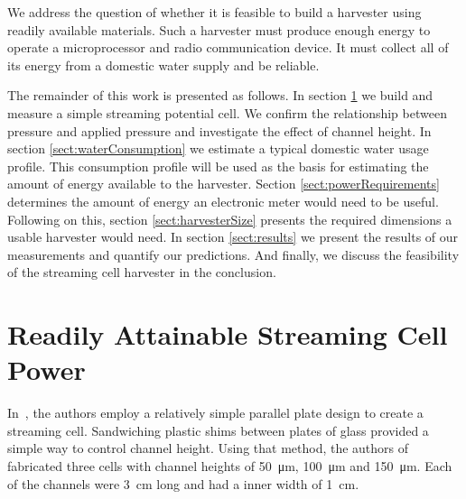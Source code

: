 \documentclass[10pt,final,journal]{IEEEtran}
\begin{document}
    We address the question of whether it is feasible to build a harvester using readily available materials.
    Such a harvester must produce enough energy to operate a microprocessor and radio communication device.
    It must collect all of its energy from a domestic water supply and be reliable.

    The remainder of this work is presented as follows.
    In section \ref{sect:streamingCell} we build and measure a simple streaming potential cell.
    We confirm the relationship between pressure and applied pressure and investigate the effect of channel height.
    In section \ref{sect:waterConsumption} we estimate a typical domestic water usage profile.
    This consumption profile will be used as the basis for estimating the amount of energy available to the harvester.
    Section \ref{sect:powerRequirements} determines the amount of energy an electronic meter would need to be useful.
    Following on this, section \ref{sect:harvesterSize} presents the required dimensions a usable harvester would need.
    In section \ref{sect:results} we present the results of our measurements and quantify our predictions.
    And finally, we discuss the feasibility of the streaming cell harvester in the conclusion.

    \section{Readily Attainable Streaming Cell Power} \label{sect:streamingCell}
    In~\cite{Gu2000}, the authors employ a relatively simple parallel plate design to create a streaming cell.
    Sandwiching plastic shims between plates of glass provided a simple way to control channel height.
    Using that method, the authors of~\cite{Gu2000} fabricated three cells with channel heights of \SI{50}{\micro\metre}, \SI{100}{\micro\metre} and \SI{150}{\micro\metre}.
    Each of the channels were \SI{3}{\centi\metre} long and had a inner width of \SI{1}{\centi\metre}.
\end{document}

